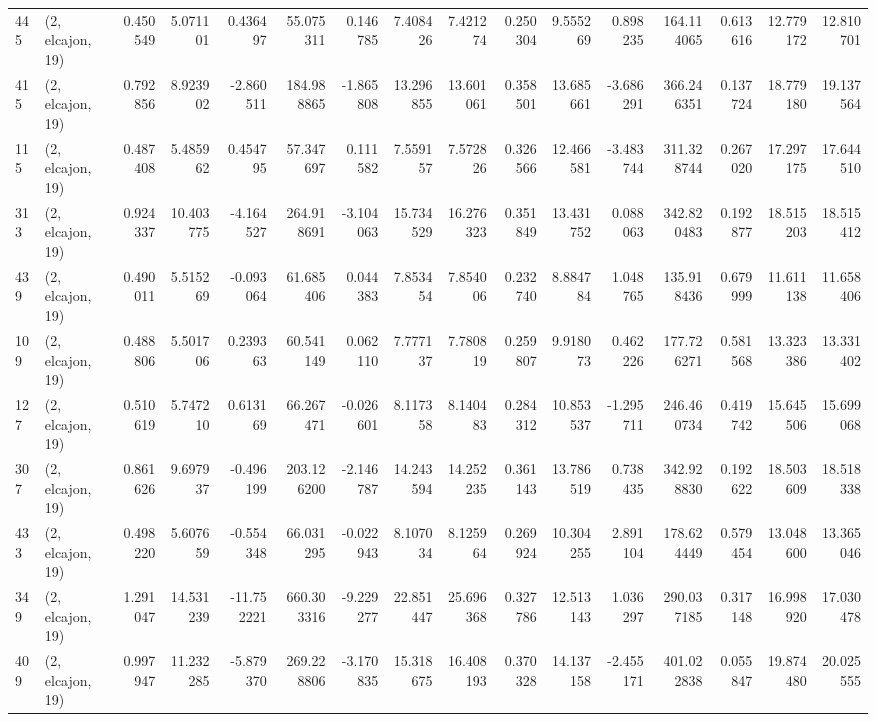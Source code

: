 \begin{tabular}{llrrrrrrrrrrrrrr}
445 &  (2, elcajon, 19) &   0.450549 &   5.071101 &   0.436497 &    55.075311 &   0.146785 &   7.408426 &   7.421274 &  0.250304 &   9.555269 &   0.898235 &   164.114065 &   0.613616 &  12.779172 &  12.810701 \\
415 &  (2, elcajon, 19) &   0.792856 &   8.923902 &  -2.860511 &   184.988865 &  -1.865808 &  13.296855 &  13.601061 &  0.358501 &  13.685661 &  -3.686291 &   366.246351 &   0.137724 &  18.779180 &  19.137564 \\
115 &  (2, elcajon, 19) &   0.487408 &   5.485962 &   0.454795 &    57.347697 &   0.111582 &   7.559157 &   7.572826 &  0.326566 &  12.466581 &  -3.483744 &   311.328744 &   0.267020 &  17.297175 &  17.644510 \\
313 &  (2, elcajon, 19) &   0.924337 &  10.403775 &  -4.164527 &   264.918691 &  -3.104063 &  15.734529 &  16.276323 &  0.351849 &  13.431752 &   0.088063 &   342.820483 &   0.192877 &  18.515203 &  18.515412 \\
439 &  (2, elcajon, 19) &   0.490011 &   5.515269 &  -0.093064 &    61.685406 &   0.044383 &   7.853454 &   7.854006 &  0.232740 &   8.884784 &   1.048765 &   135.918436 &   0.679999 &  11.611138 &  11.658406 \\
109 &  (2, elcajon, 19) &   0.488806 &   5.501706 &   0.239363 &    60.541149 &   0.062110 &   7.777137 &   7.780819 &  0.259807 &   9.918073 &   0.462226 &   177.726271 &   0.581568 &  13.323386 &  13.331402 \\
127 &  (2, elcajon, 19) &   0.510619 &   5.747210 &   0.613169 &    66.267471 &  -0.026601 &   8.117358 &   8.140483 &  0.284312 &  10.853537 &  -1.295711 &   246.460734 &   0.419742 &  15.645506 &  15.699068 \\
307 &  (2, elcajon, 19) &   0.861626 &   9.697937 &  -0.496199 &   203.126200 &  -2.146787 &  14.243594 &  14.252235 &  0.361143 &  13.786519 &   0.738435 &   342.928830 &   0.192622 &  18.503609 &  18.518338 \\
433 &  (2, elcajon, 19) &   0.498220 &   5.607659 &  -0.554348 &    66.031295 &  -0.022943 &   8.107034 &   8.125964 &  0.269924 &  10.304255 &   2.891104 &   178.624449 &   0.579454 &  13.048600 &  13.365046 \\
349 &  (2, elcajon, 19) &   1.291047 &  14.531239 & -11.752221 &   660.303316 &  -9.229277 &  22.851447 &  25.696368 &  0.327786 &  12.513143 &   1.036297 &   290.037185 &   0.317148 &  16.998920 &  17.030478 \\
409 &  (2, elcajon, 19) &   0.997947 &  11.232285 &  -5.879370 &   269.228806 &  -3.170835 &  15.318675 &  16.408193 &  0.370328 &  14.137158 &  -2.455171 &   401.022838 &   0.055847 &  19.874480 &  20.025555 \\

\end{tabular}
